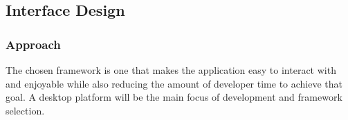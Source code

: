 \documentclass[onecolumn, draftclsnofoot,10pt, compsoc]{IEEEtran}
\begin{document}
\subsection{Interface Design}
\subsubsection{Approach}
The chosen framework is one that makes the application easy to interact with and enjoyable while also reducing the amount of developer time to achieve that goal.
A desktop platform will be the main focus of development and framework selection.
\newline
\noindent
\end{document}
